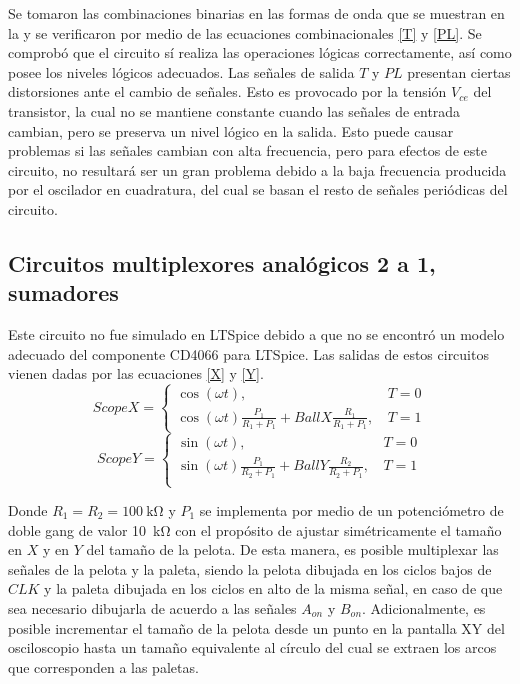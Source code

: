 Se tomaron las combinaciones binarias en las formas de onda que se muestran en la  y se verificaron por medio de las ecuaciones combinacionales \eqref{T} y \eqref{PL}.
Se comprobó que el circuito sí realiza las operaciones lógicas correctamente, así como posee los niveles lógicos adecuados.
Las señales de salida $T$ y $PL$ presentan ciertas distorsiones ante el cambio de señales.
Esto es provocado por la tensión $V_{ce}$ del transistor, la cual no se mantiene constante cuando las señales de entrada cambian, pero se preserva un nivel lógico en la salida. 
Esto puede causar problemas si las señales cambian con alta frecuencia, pero para efectos de este circuito, no resultará ser un gran problema debido a la baja frecuencia producida por el oscilador en cuadratura, del cual se basan el resto de señales periódicas del circuito. 

\subsection{Circuitos multiplexores analógicos 2 a 1, sumadores}
Este circuito no fue simulado en LTSpice debido a que no se encontró un modelo adecuado del componente CD4066 para LTSpice. 
Las salidas de estos circuitos vienen dadas por las ecuaciones \eqref{X} y \eqref{Y}.
\begin{equation}
    ScopeX = \begin{cases}
        \cos(\omega t),&\,T = 0\\
        \cos(\omega t)\frac{P_1}{R_1 + P_1} + BallX\frac{R_1}{R_1 + P_1},&\, T = 1
    \end{cases}\label{X}
\end{equation}  
\begin{equation}
    ScopeY = \begin{cases}
        \sin(\omega t),&\,T = 0\\
        \sin(\omega t)\frac{P_1}{R_2 + P_1} + BallY\frac{R_2}{R_2 + P_1},&\, T = 1\\
    \end{cases}\label{Y}
\end{equation}  

Donde $R_1 = R_2 = \SI{100}{\kohm}$ y $P_1$ se implementa por medio de un potenciómetro de doble gang de valor \SI{10}{\kohm} con el propósito de ajustar simétricamente el tamaño en $X$ y en $Y$ del tamaño de la pelota. 
De esta manera, es posible multiplexar las señales de la pelota y la paleta, siendo la pelota dibujada en los ciclos bajos de $CLK$ y la paleta dibujada en los ciclos en alto de la misma señal, en caso de que sea necesario dibujarla de acuerdo a las señales $A_{on}$ y $B_{on}$.
Adicionalmente, es posible incrementar el tamaño de la pelota desde un punto en la pantalla XY del osciloscopio hasta un tamaño equivalente al círculo del cual se extraen los arcos que corresponden a las paletas. 

